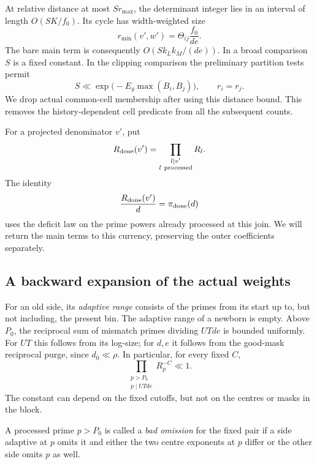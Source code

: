 At relative distance at most $S r_{\max}$, the determinant integer lies
in an interval of length $O(SK/f_0)$. Its cycle has width-weighted size
\begin{equation}\label{join:bare-cycle}
 r_{\min}(v',w')=\Theta_{ij}\frac{f_0}{de}.
\end{equation}
The bare main term is consequently $O(S k_L k_M/(de))$. In a broad
comparison $S$ is a fixed constant. In the clipping comparison the
preliminary partition tests permit
\begin{equation}\label{join:narrow-distance}
 S\ll \exp\bigl(-E_g\max(B_i,B_j)\bigr),\qquad r_i=r_j.
\end{equation}
We drop actual common-cell membership after using this distance bound.
This removes the history-dependent cell predicate from all the
subsequent counts.

For a projected denominator $v'$, put
\[
 R_{\rm done}(v')=
 \prod_{\substack{l\mid v'\\l\ \mathrm{processed}}}R_l.
\]
The identity
\begin{equation}\label{join:processed-currency}
 \frac{R_{\rm done}(v')}{d}=\pi_{\rm done}(d)
\end{equation}
uses the deficit law on the prime powers already processed at this
join. We will return the main terms to this currency, preserving the
outer coefficients separately.

\subsection{A backward expansion of the actual weights}

For an old side, its \emph{adaptive range} consists of the primes from
its start up to, but not including, the present bin. The adaptive range
of a newborn is empty. Above $P_0$, the reciprocal sum of mismatch
primes dividing $UTde$ is bounded uniformly. For $UT$ this follows from
its log-size; for $d,e$ it follows from the good-mask reciprocal purge,
since $d_0\ll\rho$. In particular, for every fixed $C$,
\begin{equation}\label{join:mismatch-restoration}
 \prod_{\substack{p>P_0\\p\mid UTde}}R_p^{-C}\ll 1.
\end{equation}
The constant can depend on the fixed cutoffs, but not on the centres or
masks in the block.

A processed prime $p>P_0$ is called a \emph{bad omission} for the fixed
pair if a side adaptive at $p$ omits it and either the two centre
exponents at $p$ differ or the other side omits $p$ as well.

